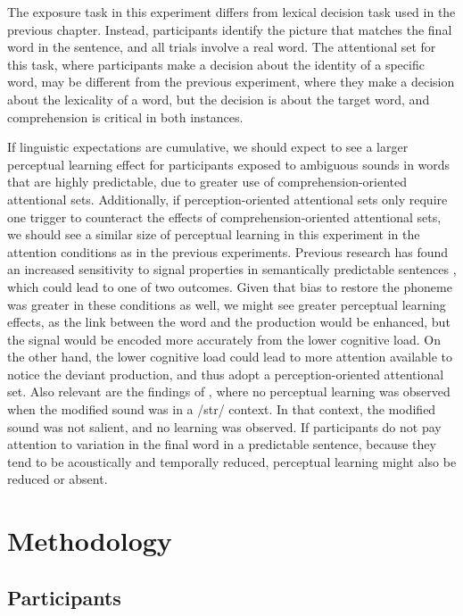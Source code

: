 The exposure task in this experiment differs from lexical decision task used in the previous chapter.  
Instead, participants identify the picture that matches the final word in the sentence, and all trials involve a real word.
The attentional set for this task, where participants make a decision about the identity of a specific word, may be different from the previous experiment, where they make a decision about the lexicality of a word, but the decision is about the target word, and comprehension is critical in both instances.

If linguistic expectations are cumulative, we should expect to see a larger perceptual learning effect for participants exposed to ambiguous sounds in words that are highly predictable, due to greater use of comprehension-oriented attentional sets.
Additionally, if perception-oriented attentional sets only require one trigger to counteract the effects of comprehension-oriented attentional sets, we should see a similar size of perceptual learning in this experiment in the attention conditions as in the previous experiments.
Previous research has found an increased sensitivity to signal properties in semantically predictable sentences \citep{Samuel1981}, which could lead to one of two outcomes.
Given that bias to restore the phoneme was greater in these conditions as well, we might see greater perceptual learning effects, as the link between the word and the production would be enhanced, but the signal would be encoded more accurately from the lower cognitive load.
On the other hand, the lower cognitive load could lead to more attention available to notice the deviant production, and thus adopt a perception-oriented attentional set.
Also relevant are the findings of \citet{Kraljic2008a}, where no perceptual learning was observed when the modified sound was in a /str/ context.
In that context, the modified sound was not salient, and no learning was observed.
If participants do not pay attention to variation in the final word in a predictable sentence, because they tend to be acoustically and temporally reduced, perceptual learning might also be reduced or absent.

\section{Methodology}

\subsection{Participants}

